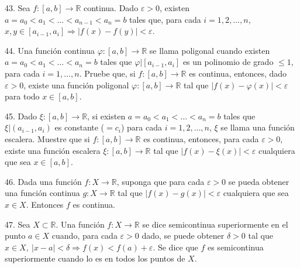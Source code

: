 \documentclass[12pt,oneside]{book}
\begin{document}
43. Sea \(f: [a, b] \to \mathbb{R}\) continua. Dado \(\varepsilon > 0\), existen \(a = a_0 < a_1 < \dots < a_{n-1} < a_n = b\) tales que, para cada \(i = 1, 2, \dots, n\), \(x, y \in [a_{i-1}, a_i] \Rightarrow |f(x) - f(y)| < \varepsilon\).

44. Una función continua \(\varphi: [a, b] \to \mathbb{R}\) se llama poligonal cuando existen \(a = a_0 < a_1 < \dots < a_n = b\) tales que \(\varphi|[a_{i-1}, a_i]\) es un polinomio de grado \(\leq 1\), para cada \(i = 1, \dots, n\). Pruebe que, si \(f: [a, b] \to \mathbb{R}\) es continua, entonces, dado \(\varepsilon > 0\), existe una función poligonal \(\varphi: [a, b] \to \mathbb{R}\) tal que \(|f(x) - \varphi(x)| < \varepsilon\) para todo \(x \in [a, b]\).

45. Dado \(\xi: [a, b] \to \mathbb{R}\), si existen \(a = a_0 < a_1 < \dots < a_n = b\) tales que \(\xi|(a_{i-1}, a_i)\) es constante (\(= c_i\)) para cada \(i = 1, 2, \dots, n\), \(\xi\) se llama una función escalera. Muestre que si \(f: [a, b] \to \mathbb{R}\) es continua, entonces, para cada \(\varepsilon > 0\), existe una función escalera \(\xi: [a, b] \to \mathbb{R}\) tal que \(|f(x) - \xi(x)| < \varepsilon\) cualquiera que sea \(x \in [a, b]\).

46. Dada una función \(f: X \to \mathbb{R}\), suponga que para cada \(\varepsilon > 0\) se pueda obtener una función continua \(g: X \to \mathbb{R}\) tal que \(|f(x) - g(x)| < \varepsilon\) cualquiera que sea \(x \in X\). Entonces \(f\) es continua.

47. Sea \(X \subset \mathbb{R}\). Una función \(f: X \to \mathbb{R}\) se dice semicontinua superiormente en el punto \(a \in X\) cuando, para cada \(\varepsilon > 0\) dado, se puede obtener \(\delta > 0\) tal que \(x \in X,\ |x - a| < \delta \Rightarrow f(x) < f(a) + \varepsilon\). Se dice que \(f\) es semicontinua superiormente cuando lo es en todos los puntos de \(X\).
\end{document}
